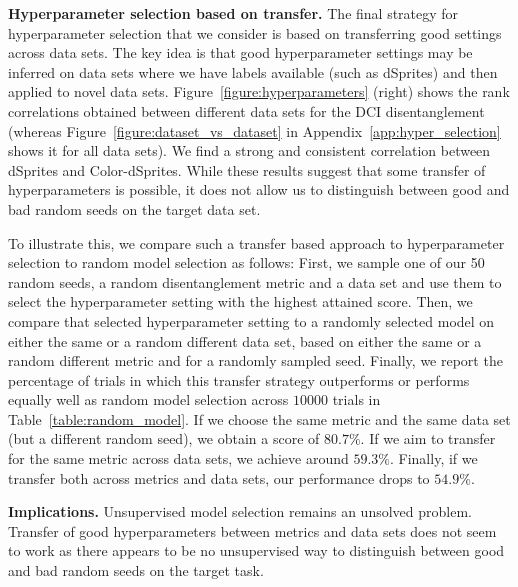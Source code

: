 \documentclass{article}
\begin{document}
\textbf{Hyperparameter selection based on transfer.}
The final strategy for hyperparameter selection that we consider is based on transferring good settings across data sets.
The key idea is that good hyperparameter settings may be inferred on data sets where we have labels available (such as dSprites) and then applied to novel data sets.
Figure~\ref{figure:hyperparameters} (right) shows the rank correlations obtained between different data sets for the DCI disentanglement (whereas Figure~\ref{figure:dataset_vs_dataset} in Appendix~\ref{app:hyper_selection} shows it for all data sets).
We find a strong and consistent correlation between dSprites and Color-dSprites. 
While these results suggest that some transfer of hyperparameters is possible, it does not allow us to distinguish between good and bad random seeds on the target data set.

To illustrate this, we compare such a transfer based approach to hyperparameter selection to random model selection as follows: 
First, we sample one of our 50 random seeds, a random  disentanglement metric and a data set and use them to select the hyperparameter setting with the highest attained score.
Then, we compare that selected hyperparameter setting to a randomly selected model on either the same or a random different data set, based on either the same or a random different metric and for a randomly sampled seed.
Finally, we report the percentage of trials in which this transfer strategy outperforms or performs equally well as random model selection across $\num{10000}$ trials in Table~\ref{table:random_model}.
If we choose the same metric and the same data set (but a different random seed), we obtain a score of $80.7\%$.
If we aim to transfer for the same metric across data sets, we achieve around $59.3\%$.
Finally, if we transfer both across metrics and data sets, our performance drops to $54.9\%$.

\textbf{Implications.} 
Unsupervised model selection remains an unsolved problem. 
Transfer of good hyperparameters between metrics and data sets does not seem to work as there appears to be no unsupervised way to distinguish between good and bad random seeds on the target task.
\end{document}
